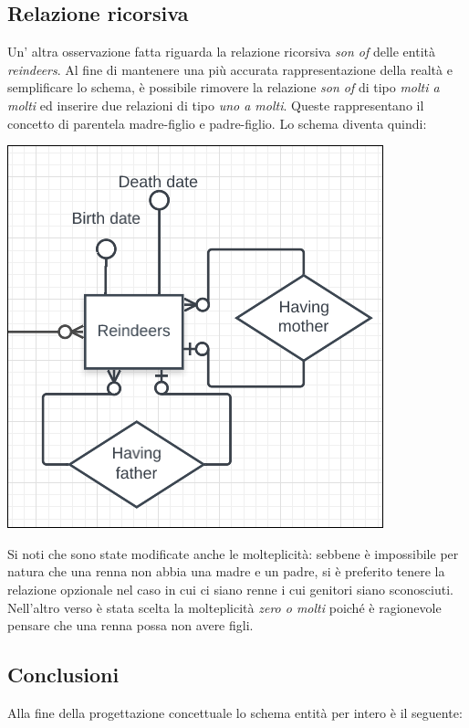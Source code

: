 \documentclass[12pt]{report}
\begin{document}
\subsection{Relazione ricorsiva}
Un' altra osservazione fatta riguarda la relazione ricorsiva \textit{son of} delle entità \textit{reindeers}.
Al fine di mantenere una più accurata rappresentazione della realtà e semplificare lo schema, è possibile
rimovere la relazione \textit{son of} di tipo \textit{molti a molti} ed inserire due relazioni di tipo
\textit{uno a molti}. Queste rappresentano il concetto di parentela madre-figlio e padre-figlio. Lo schema
diventa quindi:
\begin{center}
\includegraphics[scale=0.50]{ric1.png}
\end{center}

Si noti che sono state modificate anche le molteplicità: sebbene è impossibile per natura che una renna non abbia una
madre e un padre, si è preferito tenere la relazione opzionale nel caso in cui ci siano renne i cui genitori siano
sconosciuti. Nell'altro verso è stata scelta la molteplicità \textit{zero o molti} poiché è ragionevole pensare che una
renna possa non avere  figli.

\subsection{Conclusioni}
Alla fine della progettazione concettuale lo schema entità per intero è il seguente:
\end{document}
